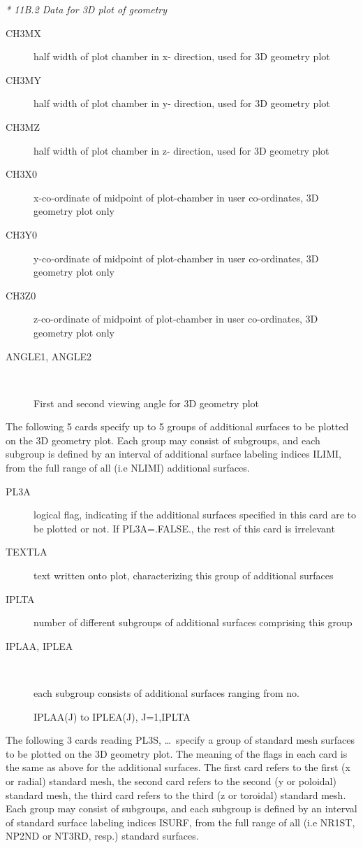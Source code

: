 \textsl{* 11B.2 Data for 3D plot of geometry}

\begin{description}
  \item[CH3MX] half width of plot chamber in x- direction, used for 3D geometry
        plot
  \item[CH3MY] half width of plot chamber in y- direction, used for 3D
        geometry plot
  \item[CH3MZ] half width of plot chamber in z- direction, used for
        3D geometry plot
  \item[CH3X0] x-co-ordinate of midpoint of plot-chamber in user
        co-ordinates, 3D geometry plot only
  \item[CH3Y0] y-co-ordinate of midpoint of
        plot-chamber in user co-ordinates, 3D geometry plot only
  \item[CH3Z0]
        z-co-ordinate of midpoint of plot-chamber in user co-ordinates, 3D geometry
        plot only
  \item[ANGLE1, ANGLE2] ~

        First and second viewing angle for 3D geometry plot
\end{description}

The following 5 cards specify up to 5 groups of additional surfaces to be
plotted on the 3D geometry plot.
Each group may consist of subgroups, and each subgroup is defined by an
interval of additional surface labeling indices ILIMI, from the full range of
all (i.e NLIMI) additional surfaces.

\begin{description}
  \item[PL3A] logical flag, indicating if the additional surfaces specified in
        this card are to be plotted or not.
        If PL3A=.FALSE., the rest of this card is irrelevant
  \item[TEXTLA] text written
        onto plot, characterizing this group of additional surfaces
  \item[IPLTA] number
        of different subgroups of additional surfaces comprising this group
  \item[IPLAA, IPLEA] ~

        each \hfill subgroup \hfill consists \hfill of \hfill additional \hfill
        surfaces \hfill ranging \hfill from \hfill no.

        IPLAA(J) to IPLEA(J), J=1,IPLTA
\end{description}

The following 3 cards reading PL3S, \dots\ specify a group of standard mesh
surfaces to be plotted on the 3D geometry plot.
The meaning of the flags in each card is the same as above for the additional
surfaces.
The first card refers to the first (x or radial) standard mesh, the second card
refers to the second (y or poloidal) standard mesh, the third card refers to
the third (z or toroidal) standard mesh.
Each group may consist of subgroups, and each subgroup is defined by an
interval of standard surface labeling indices ISURF, from the full range of all
(i.e NR1ST, NP2ND or NT3RD, resp.) standard surfaces.


